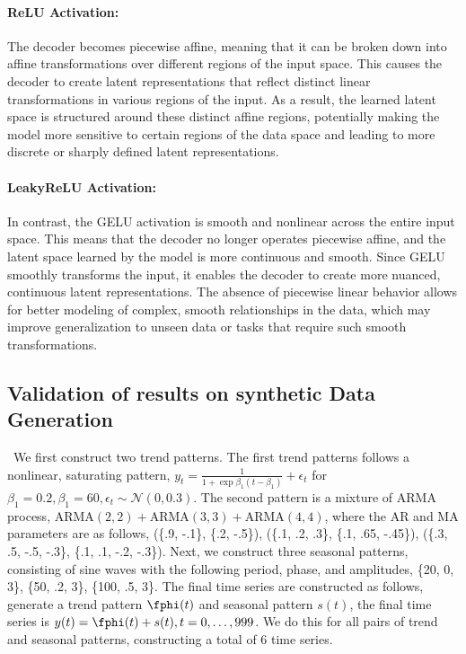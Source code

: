 \documentclass{article} %
\theoremstyle{plain}
\theoremstyle{definition}
\theoremstyle{remark}
\numberwithin{equation}{section}
\begin{document}
\paragraph{ReLU Activation:}
The decoder becomes piecewise affine, meaning that it can be broken down into affine transformations over different regions of the input space. This causes the decoder to create latent representations that reflect distinct linear transformations in various regions of the input. As a result, the learned latent space is structured around these distinct affine regions, potentially making the model more sensitive to certain regions of the data space and leading to more discrete or sharply defined latent representations.

\paragraph{LeakyReLU Activation:}
In contrast, the GELU activation is smooth and nonlinear across the entire input space. This means that the decoder no longer operates piecewise affine, and the latent space learned by the model is more continuous and smooth. Since GELU smoothly transforms the input, it enables the decoder to create more nuanced, continuous latent representations. The absence of piecewise linear behavior allows for better modeling of complex, smooth relationships in the data, which may improve generalization to unseen data or tasks that require such smooth transformations.



\subsection{Validation of results on synthetic Data Generation}
\label{app:synthetic}
\
We first construct two trend patterns. The first trend patterns follows a nonlinear, saturating pattern, $y_t = \frac{1}{1 + \exp{\beta_1(t-\beta_1)}} + \epsilon_t $ for $\beta_1=0.2, \beta_1=60, \epsilon_t \sim \mathcal{N}(0,0.3)$. The second pattern is a mixture of ARMA process, $\mathrm{ARMA}(2,2) + \mathrm{ARMA}(3,3) + \mathrm{ARMA}(4,4)$, where the AR and MA parameters are as follows, (\{.9, -.1\}, \{.2, -.5\}), (\{.1, .2, .3\}, \{.1, .65, -.45\}), (\{.3, .5, -.5, -.3\}, \{.1, .1, -.2, -.3\}). Next, we construct three seasonal patterns, consisting of sine waves with the following period, phase, and amplitudes, \{20, 0, 3\}, \{50, .2, 3\}, \{100, .5, 3\}.
The final time series are constructed as follows, generate a trend pattern $\fphi(t)$ and seasonal pattern $s(t)$, the final time series is $y(t) = \fphi(t) + s(t), t={0,\ldots,999}$. We do this for all pairs of trend and seasonal patterns, constructing a total of 6 time series.
\end{document}
